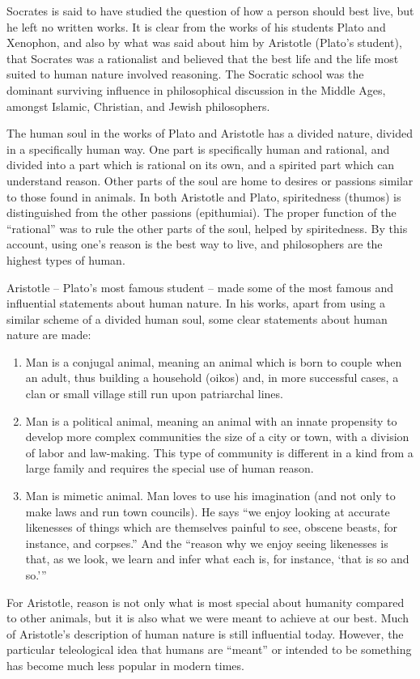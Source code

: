 Socrates is said to have studied the question of how a person should best live, but he left no written works. It is clear from the works of his students Plato and Xenophon, and also by what was said about him by Aristotle (Plato’s student), that Socrates was a rationalist and believed that the best life and the life most suited to human nature involved reasoning. The Socratic school was the dominant surviving influence in philosophical discussion in the Middle Ages, amongst Islamic, Christian, and Jewish philosophers.

The human soul in the works of Plato and Aristotle has a divided nature, divided in a specifically human way. One part is specifically human and rational, and divided into a part which is rational on its own, and a spirited part which can understand reason. Other parts of the soul are home to desires or passions similar to those found in animals. In both Aristotle and Plato, spiritedness (thumos) is distinguished from the other passions (epithumiai). The proper function of the ``rational'' was to rule the other parts of the soul, helped by spiritedness. By this account, using one’s reason is the best way to live, and philosophers are the highest types of human.

Aristotle – Plato’s most famous student – made some of the most famous and influential statements about human nature. In his works, apart from using a similar scheme of a divided human soul, some clear statements about human nature are made:
\begin{enumerate}
\item Man is a conjugal animal, meaning an animal which is born to couple when an adult, thus building a household (oikos) and, in more successful cases, a clan or small village still run upon patriarchal lines.
\item Man is a political animal, meaning an animal with an innate propensity to develop more complex communities the size of a city or town, with a division of labor and law-making. This type of community is different in a kind from a large family and requires the special use of human reason.
\item Man is mimetic animal. Man loves to use his imagination (and not only to make laws and run town councils). He says ``we enjoy looking at accurate likenesses of things which are themselves painful to see, obscene beasts, for instance, and corpses.''  And the ``reason why we enjoy seeing likenesses is that, as we look, we learn and infer what each is, for instance, ‘that is so and so.’''
\end{enumerate}
For Aristotle, reason is not only what is most special about humanity compared to other animals, but it is also what we were meant to achieve at our best. Much of Aristotle’s description of human nature is still influential today. However, the particular teleological idea that humans are ``meant'' or intended to be something has become much less popular in modern times.

